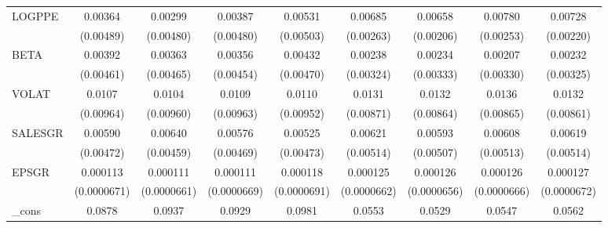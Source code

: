 \begin{table}[htbp]
\begin{tabular}{l*{8}{c}}
LOGPPE              &     0.00364         &     0.00299         &     0.00387         &     0.00531         &     0.00685\sym{**} &     0.00658\sym{***}&     0.00780\sym{***}&     0.00728\sym{***}\\
                    &   (0.00489)         &   (0.00480)         &   (0.00480)         &   (0.00503)         &   (0.00263)         &   (0.00206)         &   (0.00253)         &   (0.00220)         \\
BETA                &     0.00392         &     0.00363         &     0.00356         &     0.00432         &     0.00238         &     0.00234         &     0.00207         &     0.00232         \\
                    &   (0.00461)         &   (0.00465)         &   (0.00454)         &   (0.00470)         &   (0.00324)         &   (0.00333)         &   (0.00330)         &   (0.00325)         \\
VOLAT               &      0.0107         &      0.0104         &      0.0109         &      0.0110         &      0.0131         &      0.0132         &      0.0136         &      0.0132         \\
                    &   (0.00964)         &   (0.00960)         &   (0.00963)         &   (0.00952)         &   (0.00871)         &   (0.00864)         &   (0.00865)         &   (0.00861)         \\
SALESGR             &     0.00590         &     0.00640         &     0.00576         &     0.00525         &     0.00621         &     0.00593         &     0.00608         &     0.00619         \\
                    &   (0.00472)         &   (0.00459)         &   (0.00469)         &   (0.00473)         &   (0.00514)         &   (0.00507)         &   (0.00513)         &   (0.00514)         \\
EPSGR               &    0.000113\sym{*}  &    0.000111\sym{*}  &    0.000111         &    0.000118\sym{*}  &    0.000125\sym{*}  &    0.000126\sym{*}  &    0.000126\sym{*}  &    0.000127\sym{*}  \\
                    & (0.0000671)         & (0.0000661)         & (0.0000669)         & (0.0000691)         & (0.0000662)         & (0.0000656)         & (0.0000666)         & (0.0000672)         \\
\_cons              &      0.0878\sym{*}  &      0.0937\sym{*}  &      0.0929\sym{*}  &      0.0981\sym{**} &      0.0553\sym{*}  &      0.0529         &      0.0547\sym{*}  &      0.0562\sym{*}  \\

\end{tabular}
\end{table}
